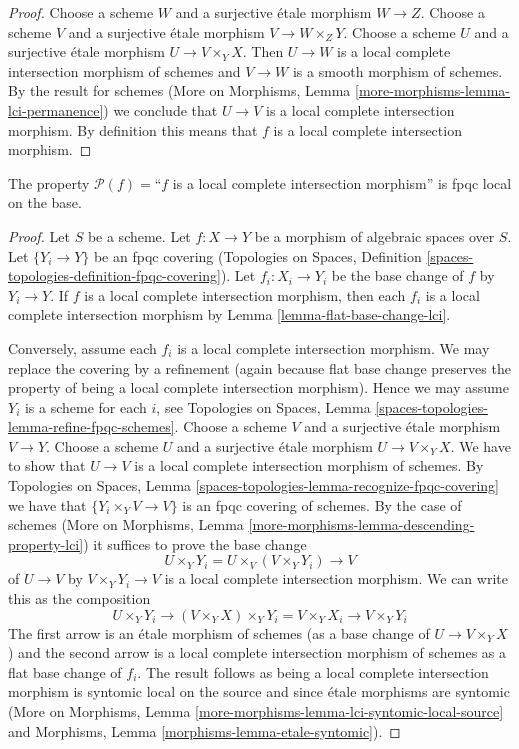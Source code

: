 \begin{proof}
Choose a scheme $W$ and a surjective \'etale morphism $W \to Z$.
Choose a scheme $V$ and a surjective \'etale morphism $V \to W \times_Z Y$.
Choose a scheme $U$ and a surjective \'etale morphism $U \to V \times_Y X$.
Then $U \to W$ is a local complete intersection morphism of schemes and
$V \to W$ is a smooth morphism of schemes. By the result for schemes
(More on Morphisms, Lemma \ref{more-morphisms-lemma-lci-permanence})
we conclude that $U \to V$ is a local complete intersection morphism.
By definition this means that $f$ is a local complete intersection morphism.
\end{proof}

\begin{lemma}
\label{lemma-descending-property-lci}
The property $\mathcal{P}(f) =$``$f$ is a local complete intersection
morphism'' is fpqc local on the base.
\end{lemma}

\begin{proof}
Let $S$ be a scheme. Let $f : X \to Y$ be a
morphism of algebraic spaces over $S$.
Let $\{Y_i \to Y\}$ be an fpqc covering
(Topologies on Spaces, Definition
\ref{spaces-topologies-definition-fpqc-covering}).
Let $f_i : X_i \to Y_i$ be the base change of $f$ by $Y_i \to Y$.
If $f$ is a local complete intersection morphism,
then each $f_i$ is a local complete intersection morphism
by Lemma \ref{lemma-flat-base-change-lci}.

\medskip\noindent
Conversely, assume each $f_i$ is a local complete intersection morphism.
We may replace the covering by a refinement (again because
flat base change preserves the property of being a
local complete intersection morphism). Hence we may assume
$Y_i$ is a scheme for each $i$, see
Topologies on Spaces, Lemma \ref{spaces-topologies-lemma-refine-fpqc-schemes}.
Choose a scheme $V$ and a surjective \'etale morphism $V \to Y$.
Choose a scheme $U$ and a surjective \'etale morphism
$U \to V \times_Y X$. We have to show that $U \to V$ is a
local complete intersection morphism of schemes.
By Topologies on Spaces, Lemma
\ref{spaces-topologies-lemma-recognize-fpqc-covering}
we have that $\{Y_i \times_Y V \to V\}$ is an fpqc covering
of schemes. By the case of schemes
(More on Morphisms, Lemma \ref{more-morphisms-lemma-descending-property-lci})
it suffices to prove the base change
$$
U \times_Y Y_i = U \times_V (V \times_Y Y_i) \longrightarrow V
$$
of $U \to V$ by $V \times_Y Y_i \to V$ is a
local complete intersection morphism. We can write this as the
composition
$$
U \times_Y Y_i \longrightarrow
(V \times_Y X) \times_Y Y_i = V \times_Y X_i \longrightarrow
V \times_Y Y_i
$$
The first arrow is an \'etale morphism of schemes (as a base change of
$U \to V \times_Y X$) and the second arrow is a
local complete intersection morphism of schemes as a flat base change of $f_i$.
The result follows as being a local complete intersection morphism
is syntomic local on the source and since \'etale morphisms
are syntomic (More on Morphisms, Lemma
\ref{more-morphisms-lemma-lci-syntomic-local-source}
and Morphisms, Lemma \ref{morphisms-lemma-etale-syntomic}).
\end{proof}

